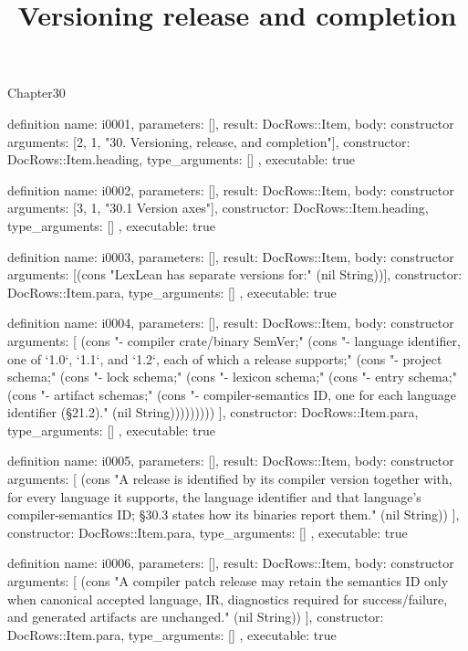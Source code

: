 \begin{lexlean}{Chapter30}
\title{Versioning release and completion}
\begin{semanticmodule}
definition{
  name: i0001,
  parameters: [],
  result: DocRows::Item,
  body: constructor{
    arguments: [2, 1, "30. Versioning, release, and completion"],
    constructor: DocRows::Item.heading,
    type_arguments: []
  },
  executable: true
}

definition{
  name: i0002,
  parameters: [],
  result: DocRows::Item,
  body: constructor{
    arguments: [3, 1, "30.1 Version axes"],
    constructor: DocRows::Item.heading,
    type_arguments: []
  },
  executable: true
}

definition{
  name: i0003,
  parameters: [],
  result: DocRows::Item,
  body: constructor{
    arguments: [(cons "LexLean has separate versions for:" (nil String))],
    constructor: DocRows::Item.para,
    type_arguments: []
  },
  executable: true
}

definition{
  name: i0004,
  parameters: [],
  result: DocRows::Item,
  body: constructor{
    arguments: [
      (cons "- compiler crate/binary SemVer;" (cons "- language identifier, one of `1.0`, `1.1`, and `1.2`, each of which a release supports;" (cons "- project schema;" (cons "- lock schema;" (cons "- lexicon schema;" (cons "- entry schema;" (cons "- artifact schemas;" (cons "- compiler-semantics ID, one for each language identifier (§21.2)." (nil String)))))))))
    ],
    constructor: DocRows::Item.para,
    type_arguments: []
  },
  executable: true
}

definition{
  name: i0005,
  parameters: [],
  result: DocRows::Item,
  body: constructor{
    arguments: [
      (cons "A release is identified by its compiler version together with, for every language it supports, the language identifier and that language's compiler-semantics ID; §30.3 states how its binaries report them." (nil String))
    ],
    constructor: DocRows::Item.para,
    type_arguments: []
  },
  executable: true
}

definition{
  name: i0006,
  parameters: [],
  result: DocRows::Item,
  body: constructor{
    arguments: [
      (cons "A compiler patch release may retain the semantics ID only when canonical accepted language, IR, diagnostics required for success/failure, and generated artifacts are unchanged." (nil String))
    ],
    constructor: DocRows::Item.para,
    type_arguments: []
  },
  executable: true
}


\end{semanticmodule}
\end{lexlean}
